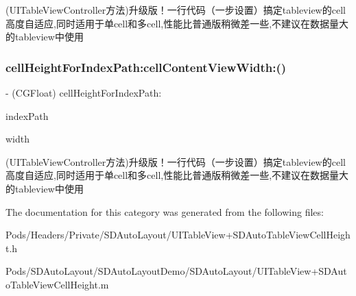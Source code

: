 (U\+I\+Table\+View\+Controller方法)升级版！一行代码（一步设置）搞定tableview的cell高度自适应,同时适用于单cell和多cell,性能比普通版稍微差一些,不建议在数据量大的tableview中使用 \mbox{\label{category_u_i_table_view_controller_07_s_d_table_view_controller_auto_cell_height_08_a0b27faff66706fa974400d4904f264c8}} 
\subsubsection{\texorpdfstring{cell\+Height\+For\+Index\+Path\+:cell\+Content\+View\+Width\+:()}{cellHeightForIndexPath:cellContentViewWidth:()}\hspace{0.1cm}{\footnotesize\ttfamily [3/3]}}
{\footnotesize\ttfamily -\/ (C\+G\+Float) cell\+Height\+For\+Index\+Path\+: \begin{DoxyParamCaption}\item[{(N\+S\+Index\+Path $\ast$)}]{index\+Path }\item[{cellContentViewWidth:(C\+G\+Float)}]{width }\end{DoxyParamCaption}}

(U\+I\+Table\+View\+Controller方法)升级版！一行代码（一步设置）搞定tableview的cell高度自适应,同时适用于单cell和多cell,性能比普通版稍微差一些,不建议在数据量大的tableview中使用 

The documentation for this category was generated from the following files\+:\begin{DoxyCompactItemize}
\item 
Pods/\+Headers/\+Private/\+S\+D\+Auto\+Layout/U\+I\+Table\+View+\+S\+D\+Auto\+Table\+View\+Cell\+Height.\+h\item 
Pods/\+S\+D\+Auto\+Layout/\+S\+D\+Auto\+Layout\+Demo/\+S\+D\+Auto\+Layout/U\+I\+Table\+View+\+S\+D\+Auto\+Table\+View\+Cell\+Height.\+m\end{DoxyCompactItemize}

